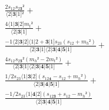 \documentclass[varwidth, border=5pt]{standalone}
\begin{document}
\begin{my}
$\begin{gathered}
\scriptscriptstyle\frac{2s_{12}s_{2𝟑}²}{⟨2|𝟑|1]²} +\\
\scriptscriptstyle\frac{4⟨1|𝟑|2]m_t²}{⟨2|𝟑|1]} +\\
\scriptscriptstyle\frac{-1⟨2|𝟑|2]⟨1|2+𝟑|1]s_{23}(s_{12}+m_h²)}{⟨2|𝟑|1]⟨2|𝟑|𝟒|𝟓|1]} +\\
\scriptscriptstyle\frac{4s_{12}s_{2𝟑}²(m_h²-2m_t²)}{⟨2|𝟑|1]⟨2|𝟑|𝟒|𝟓|1]} +\\
\scriptscriptstyle\frac{1/2s_{23}⟨1|𝟑|2](s_{12𝟒}-s_{12}+m_h²)}{⟨2|𝟑|𝟒|𝟓|1]} +\\
\scriptscriptstyle\frac{-1/2s_{23}⟨1|𝟒|2](s_{12𝟑}+s_{12}-m_h²)}{⟨2|𝟑|𝟒|𝟓|1]} \phantom{+}
\end{gathered}$
\end{my}
\end{document}
